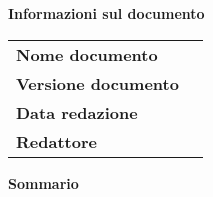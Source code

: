 % 
%
% 
%


\begin{center}

	\textbf{\Large Informazioni sul documento}
	\vspace{0.5 cm}

	\begin{longtable}{ l | p{6 cm} } %
		\textbf{Nome documento} &  {\documentName} \\[0.5 cm]
		\textbf{Versione documento} & {\documentVersion} \\[0.5 cm]
		\textbf{Data redazione} & {\redactionDate} \\[0.5 cm]
		\textbf{Redattore} & \parbox{\textwidth}{\documentListAuthor} \\[0.5 cm]
	\end{longtable}

	\vspace{2 cm}

	\textbf{\Large Sommario} \\
	\documentScope

\end{center}

\pagebreak